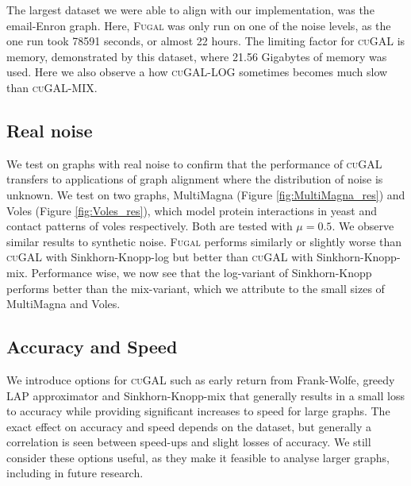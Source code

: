 The largest dataset we were able to align with our implementation, was the email-Enron graph. Here, \textsc{Fugal} was only run on one of the noise levels, as the one run took 78591 seconds, or almost 22 hours. The limiting factor for \textsc{cuGAL} is memory, demonstrated by this dataset, where 21.56 Gigabytes of memory was used. Here we also observe a how \textsc{cuGAL-LOG} sometimes becomes much slow than \textsc{cuGAL-MIX}.

\subsection{Real noise}
\indent
{}

We test on graphs with real noise to confirm that the performance of \textsc{cuGAL} transfers to applications of graph alignment where the distribution of noise is unknown. We test on two graphs, MultiMagna (Figure \ref{fig:MultiMagna_res}) and Voles (Figure \ref{fig:Voles_res}), which model protein interactions in yeast and contact patterns of voles respectively. Both are tested with $\mu = 0.5$. We observe similar results to synthetic noise. \textsc{Fugal} performs similarly or slightly worse than \textsc{cuGAL} with Sinkhorn-Knopp-log but better than \textsc{cuGAL} with Sinkhorn-Knopp-mix. Performance wise, we now see that the log-variant of Sinkhorn-Knopp performs better than the mix-variant, which we attribute to the small sizes of MultiMagna and Voles.

\subsection{Accuracy and Speed}
We introduce options for \textsc{cuGAL} such as early return from Frank-Wolfe, greedy LAP approximator and Sinkhorn-Knopp-mix that generally results in a small loss to accuracy while providing significant increases to speed for large graphs. The exact effect on accuracy and speed depends on the dataset, but generally a correlation is seen between speed-ups and slight losses of accuracy. We still consider these options useful, as they make it feasible to analyse larger graphs, including in future research.